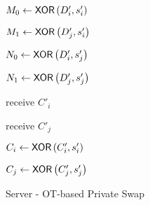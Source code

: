 \begin{figure} [H]
\begin{minipage}{0.5\textwidth}
\begin{algorithm}[H]
        \end{algorithm}
    \end{minipage}
    \begin{minipage}{0.49\textwidth}
        \begin{algorithm}[H]
            \LinesNumbered
            \caption{Server - \newline OT-based Private Swap}
            \label{algo:ServerOTPS}
        
    
            \vspace*{0.48cm}
    
            $ M_0 \gets \mathsf{{XOR}} \left( D'_i, s'_i \right) $
    
            $ M_1 \gets \mathsf{{XOR}} \left( D'_j, s'_i \right) $
    
    
            $ N_0 \gets \mathsf{{XOR}} \left( D'_i, s'_j \right) $
    
            $ N_1 \gets \mathsf{{XOR}} \left( D'_j, s'_j \right) $
    
            \phantom{$ b' \gets \NOT \left( b \right) $}
    
    
            \phantom{$ C'_i \gets \XOR \left( M_b, s_i \right) $}
    
    
            receive $ C'_i $
    
            receive $ C'_j $
    
            $ C_i \gets \mathsf{{XOR}} \left( C'_i, s'_i \right) $
    
            $ C_j \gets \mathsf{{XOR}} \left( C'_j, s'_j \right) $
    
            \vspace*{0.48cm}
    
    
        \end{algorithm}
    \end{minipage}
\end{figure}

